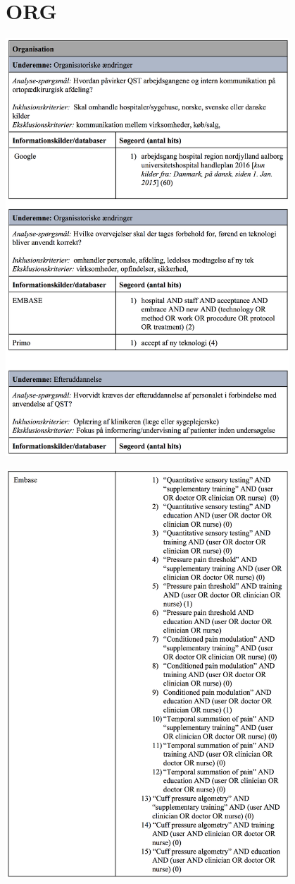 \section{ORG}\label{ORG_sog}
\begin{center}
	\includegraphics[width=0.8\textwidth]{rapportAfsnit/qBilag/sogninger/ORG1}
	
	\includegraphics[width=0.8\textwidth]{rapportAfsnit/qBilag/sogninger/ORG2}
	

\end{center}

